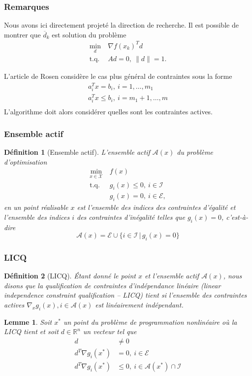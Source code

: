 \documentclass[usepdftitle=false,aspectratio=169]{beamer}
\newtheorem{defn}{Définition}
\newtheorem{lem}{Lemme}
\def\cA{\mathcal{A}}
\def\cE{\mathcal{E}}
\def\cI{\mathcal{I}}
\def\cX{\mathcal{X}}
\def\RR{\mathbb{R}}
\begin{document}
\begin{frame}
	\frametitle{Remarques}
	
	Nous avons ici directement projeté la direction de recherche. Il est possible de montrer que $\overline{d}_k$ est solution du problème
	\begin{align*}
	\min_{d} \ & \nabla f(x_k)^Td \\
	\mbox{t.q. } & Ad = 0,\ \|d\| = 1.
	\end{align*}
	
	\mbox{}
	
	L'article de Rosen considère le cas plus général de contraintes sous la forme
	\begin{align*}
	a_i^T x = b_i,\ i = 1,\ldots,m_1 \\
	a_i^T x \leq b_i,\ i = m_1+1,\ldots,m \\
	\end{align*}
	L'algorithme doit alors considérer quelles sont les contraintes actives.
	
\end{frame}

\begin{frame}
\frametitle{Ensemble actif}

\begin{defn}[Ensemble actif]
L'ensemble actif $\cA(x)$ du problème d'optimisation
\begin{align*}
\min_{x \in \cX} \ & f(x) \\
\mbox{t.q. } & g_i(x) \leq 0,\ i \in \cI \\
& g_i(x) = 0,\ i \in \cE,
\end{align*}
en un point réalisable $x$ est l'ensemble des indices des contraintes d'égalité et l'ensemble des indices $i$ des contraintes d'inégalité telles que $g_i(x) = 0$, c'est-à-dire
$$
\cA(x) = \cE \cup \{ i \in \cI \,|\, g_i(x) = 0 \}
$$
\end{defn}

\end{frame}

\begin{frame}
\frametitle{LICQ}

\begin{defn}[LICQ]
Étant donné le point $x$ et l'ensemble actif $\cA(x)$, nous disons que la qualification de contraintes d'indépendance linéaire (linear
independence constraint qualification -- LICQ) tient si l'ensemble des contraintes actives $\nabla_x g_i(x), i \in \cA(x)$ est linéairement indépendant.
\end{defn}

\begin{lem}
	Soit $x^*$ un point du problème de programmation nonlinéaire où la LICQ tient et soit $d \in \RR^n$ un vecteur tel que
	\begin{align*}
	d & \ne 0 \\
	d^T \nabla g_i(x^*) &= 0,\ i \in \cE \\
	d^T \nabla g_i(x^*) &\leq 0,\ i \in \cA(x^*) \cap \cI
	\end{align*}
\end{lem}

\end{frame}
\end{document}
